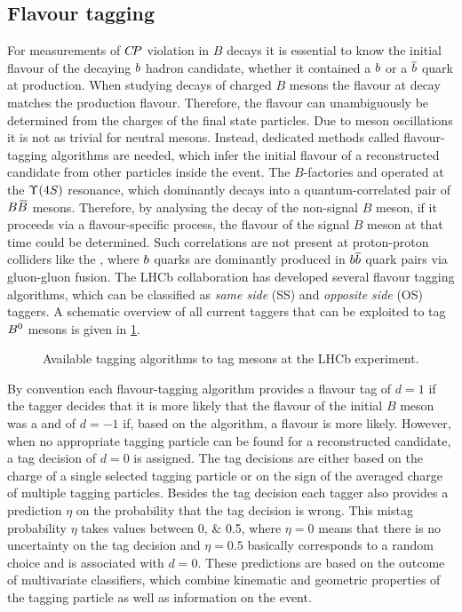 
\subsection{Flavour tagging}
\label{sec:detector:software:tagging}

For measurements of ${C\!P}$ violation in $B$ decays it is essential to know the
initial flavour of the decaying ${b}$ hadron candidate, \ie whether it
contained a ${b}$ or a ${\overline {{b}}}$ quark at production. When studying
decays of charged $B$ mesons the flavour at decay matches the production
flavour. Therefore, the flavour can unambiguously be determined from the
charges of the final state particles. Due to meson oscillations it is not as
trivial for neutral mesons. Instead, dedicated methods called flavour-tagging
algorithms are needed, which infer the initial flavour of a reconstructed
candidate from other particles inside the event. The $B$-factories \babar and
\belle operated at the $\FourS$ resonance, which dominantly decays into a
quantum-correlated pair of $B{\kern 0.18em\overline{\kern -0.18em B}{}}$ mesons. Therefore, by analysing the decay
of the non-signal $B$ meson, \eg if it proceeds via a flavour-specific
process, the flavour of the signal $B$ meson at that time could be determined.
Such correlations are not present at proton-proton colliders like the \lhc,
where ${b}$ quarks are dominantly produced in ${{b}{\overline {{b}}}}$ quark pairs via
gluon-gluon fusion. The LHCb collaboration has developed several flavour
tagging algorithms, which can be classified as \emph{same side} (SS) and
\emph{opposite side} (OS) taggers. A schematic overview of all current taggers
that can be exploited to tag ${{B}^0}$ mesons is given in
\cref{fig:detector:tagging:schematics}.
\begin{figure}[htb]
\centering

\caption{Available tagging algorithms to tag \Bz mesons at the LHCb experiment.}
\label{fig:detector:tagging:schematics}
\end{figure}
By convention each flavour-tagging algorithm provides a flavour tag of $d =
\num{+1}$ if the tagger decides that it is more likely that the flavour of the
initial $B$ meson was a \Bz and of $d = \num{-1}$ if, based on the algorithm,
a \Bzb flavour is more likely. However, when no appropriate tagging particle
can be found for a reconstructed candidate, a tag decision of $d = 0$ is
assigned. The tag decisions are either based on the charge of a single
selected tagging particle or on the sign of the averaged charge of multiple
tagging particles. Besides the tag decision each tagger also provides a
prediction $\eta$ on the probability that the tag decision is wrong. This
mistag probability $\eta$ takes values between \numlist{0;0.5}, where $\eta =
0$ means that there is no uncertainty on the tag decision and $\eta = 0.5$
basically corresponds to a random choice and is associated with $d = 0$. These
predictions are based on the outcome of multivariate classifiers, which
combine kinematic and geometric properties of the tagging particle as well as
information on the event.

